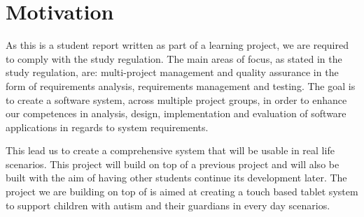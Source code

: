 \section{Motivation}
As this is a student report written as part of a learning project, we are required to comply with the study regulation. The main areas of focus, as stated in the study regulation, are: multi-project management and quality assurance in the form of requirements analysis, requirements management and testing. The goal is to create a software system, across multiple project groups, in order to enhance our competences in analysis, design, implementation and evaluation of software applications in regards to system requirements. \cite{studyreg} 

This lead us to create a comprehensive system that will be usable in real life scenarios. This project will build on top of a previous project and will also be built with the aim of having other students continue its development later. The project we are building on top of is aimed at creating a touch based tablet system to support children with autism and their guardians in every day scenarios.